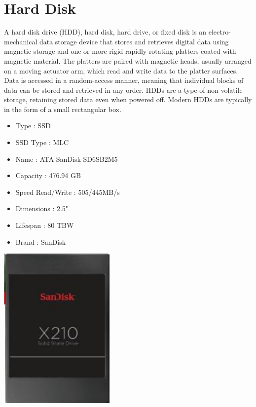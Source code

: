 \documentclass{article}
\begin{document}
\section{Hard Disk}
A hard disk drive (HDD), hard disk, hard drive, or fixed disk is an electro-mechanical data storage device that stores and retrieves digital data using magnetic storage and one or more rigid rapidly rotating platters coated with magnetic material. The platters are paired with magnetic heads, usually arranged on a moving actuator arm, which read and write data to the platter surfaces. Data is accessed in a random-access manner, meaning that individual blocks of data can be stored and retrieved in any order. HDDs are a type of non-volatile storage, retaining stored data even when powered off. Modern HDDs are typically in the form of a small rectangular box.
\begin{itemize}
  \item Type                : SSD 
  \item SSD Type            : MLC
  \item Name                : ATA SanDisk SD6SB2M5
  \item Capacity            : 476.94 GB
  \item Speed Read/Write    : 505/445MB/s
  \item Dimensions          : 2.5"
  \item Lifespan            : 80 TBW
  \item Brand               : SanDisk
\end{itemize}
\href{https://www.mouser.com/datasheet/2/669/SanDisk_DataSheet_X210_08_06_13-805929.pdf}{\includegraphics[height=8cm]{SSD.jpg}} 
\end{document}
